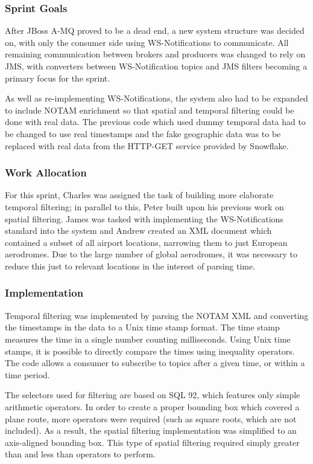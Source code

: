 \documentclass[a4paper, 12pt, twoside]{article}
\begin{document}
\subsubsection{Sprint Goals}

After JBoss A-MQ proved to be a dead end, a new system structure was decided on, with only the consumer side using WS-Notifications to communicate. All remaining communication between brokers and producers was changed to rely on JMS, with converters between WS-Notification topics and JMS filters becoming a primary focus for the sprint.

As well as re-implementing WS-Notifications, the system also had to be expanded to include NOTAM enrichment so that spatial and temporal filtering could be done with real data. The previous code which used dummy temporal data had to be changed to use real timestamps and the fake geographic data was to be replaced with real data from the HTTP-GET service provided by Snowflake.

\subsubsection{Work Allocation}

For this sprint, Charles was assigned the task of building more elaborate temporal filtering; in parallel to this, Peter built upon his previous work on spatial filtering. James was tasked with implementing the WS-Notifications standard into the system and Andrew created an XML document which contained a subset of all airport locations, narrowing them to just European aerodromes. Due to the large number of global aerodromes, it was necessary to reduce this just to relevant locations in the interest of parsing time.

\subsubsection{Implementation}

Temporal filtering was implemented by parsing the NOTAM XML and converting the timestamps in the data to a Unix time stamp format. The time stamp measures the time in a single number counting milliseconds. Using Unix time stamps, it is possible to directly compare the times using inequality operators. The code allows a consumer to subscribe to topics after a given time, or within a time period.

The selectors used for filtering are based on SQL 92, which features only simple arithmetic operators. In order to create a proper bounding box which covered a plane route, more operators were required (such as square roots, which are not included). As a result, the spatial filtering implementation was simplified to an axis-aligned bounding box. This type of spatial filtering required simply greater than and less than operators to perform.
\end{document}
